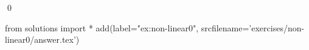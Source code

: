 
\begin{ex} 
  \label{ex:non-linear0}
  
  \qed
\end{ex} 
\begin{python0}
from solutions import *
add(label="ex:non-linear0",
    srcfilename='exercises/non-linear0/answer.tex') 
\end{python0}
